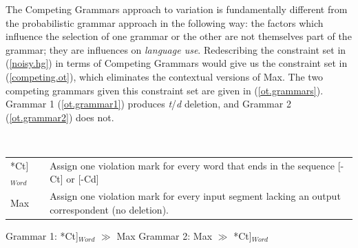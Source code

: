 The Competing Grammars approach to variation is fundamentally different from the probabilistic grammar approach in the following way: the factors which influence the selection of one grammar or the other are not themselves part of the grammar; they are influences on \textsl{language use}.
Redescribing the constraint set in (\ref{noisy.hg}) in terms of Competing Grammars would give us the constraint set in (\ref{competing.ot}), which eliminates the contextual versions of {\sc Max}.
The two competing grammars given this constraint set are given in (\ref{ot.grammars}).
Grammar 1 (\ref{ot.grammar1}) produces {\sl t}/{\sl d} deletion, and Grammar 2 (\ref{ot.grammar2}) does not.
\begin{exe}
	\ex \label{competing.ot}\ \\
	\begin{tabular}{lp{3in}}
	*{\sc Ct}]$_{Word}$& Assign one violation mark for every word that ends in the sequence [-Ct] or [-Cd]\\
	{\sc Max} & Assign one violation mark for every input segment lacking an output correspondent (no deletion).
	\end{tabular}
	\ex \label{ot.grammars}
		\begin{xlist}
			\ex Grammar 1: *{\sc Ct}]$_{Word}$ $\gg$ {\sc Max} \label{ot.grammar1}
			\ex Grammar 2: {\sc Max} $\gg$ *{\sc Ct}]$_{Word}$ \label{ot.grammar2}
		\end{xlist}
\end{exe}

